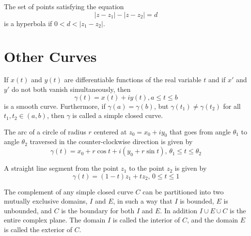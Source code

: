 \documentclass[handout]{ximera}
\begin{document}
\begin{example}[example 7]
The set of points satisfying the equation
\[
|z-z_1| - |z-z_2| = d
\]
is a hyperbola if $0 < d < |z_1 -z_2|$.
\end{example}



\section{Other Curves}


If $x(t)$ and $y(t)$ are differentiable functions of the real variable $t$ and if $x'$ and $y'$ do not both vanish simultaneously,
then
\[
\gamma(t)= x(t) + iy(t),  a \leq t \leq b
\]
is a smooth curve. Furthermore, if $\gamma(a) =\gamma(b)$, but $\gamma(t_1) \neq \gamma(t_2)$ for all $t_1,t_2 \in (a,b)$,
then $\gamma$ is called a simple closed curve.


\begin{example}[example 8]
The arc of a circle of radius $r$ centered at $z_0 = x_0 + iy_0$ that goes from angle $\theta_1$ to angle $\theta_2$ traversed in the counter-clockwise 
direction is given by
\[
\gamma(t) = x_0 + r\cos t + i(y_0 + r\sin t), \, \theta_1 \leq t \leq \theta_2
\]
\end{example}

\begin{example}[example 9]
A straight line segment from the point $z_1$ to the point $z_2$ is given by
\[
\gamma(t) = (1-t)z_1 + tz_2, \, 0 \leq t \leq 1
\]

\begin{image}
\end{image}
\end{example}


\begin{theorem}
The complement of any simple closed curve $C$ can be partitioned into two mutually exclusive domains, $I$ and $E$, in such a way that $I$ is bounded,
$E$ is unbounded, and $C$ is the boundary for both $I$ and $E$. In addition $I \cup E \cup C$ is the entire complex plane.
The domain $I$ is called the interior of $C$, and the domain $E$ is called the exterior of $C$.
\end{theorem}
\end{document}
